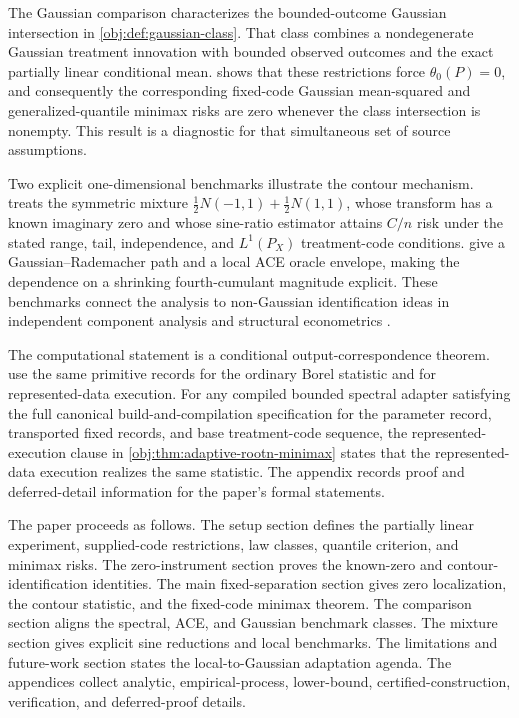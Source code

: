 The Gaussian comparison characterizes the bounded-outcome Gaussian intersection in \cref{obj:def:gaussian-class}. That class combines a nondegenerate Gaussian treatment innovation with bounded observed outcomes and the exact partially linear conditional mean.  shows that these restrictions force \(\theta_0(P)=0\), and consequently the corresponding fixed-code Gaussian mean-squared and generalized-quantile minimax risks are zero whenever the class intersection is nonempty. This result is a diagnostic for that simultaneous set of source assumptions.

Two explicit one-dimensional benchmarks illustrate the contour mechanism.  treats the symmetric mixture \(\frac12N(-1,1)+\frac12N(1,1)\), whose transform has a known imaginary zero and whose sine-ratio estimator attains \(C/n\) risk under the stated range, tail, independence, and \(L^1(P_X)\) treatment-code conditions.  give a Gaussian--Rademacher path and a local ACE oracle envelope, making the dependence on a shrinking fourth-cumulant magnitude explicit. These benchmarks connect the analysis to non-Gaussian identification ideas in independent component analysis and structural econometrics \citep{Comon1994,HyvarinenOja1997,HyvarinenKarhunenOja2001,LanneMeitzSaikkonen2017,LeeMesters2024,HoeschLeeMesters2024,ReizingerEtAl2025}.

The computational statement is a conditional output-correspondence theorem.  use the same primitive records for the ordinary Borel statistic and for represented-data execution. For any compiled bounded spectral adapter satisfying the full canonical build-and-compilation specification for the parameter record, transported fixed records, and base treatment-code sequence, the represented-execution clause in \cref{obj:thm:adaptive-rootn-minimax} states that the represented-data execution realizes the same statistic. The appendix records proof and deferred-detail information for the paper's formal statements.

The paper proceeds as follows. The setup section defines the partially linear experiment, supplied-code restrictions, law classes, quantile criterion, and minimax risks. The zero-instrument section proves the known-zero and contour-identification identities. The main fixed-separation section gives zero localization, the contour statistic, and the fixed-code minimax theorem. The comparison section aligns the spectral, ACE, and Gaussian benchmark classes. The mixture section gives explicit sine reductions and local benchmarks. The limitations and future-work section states the local-to-Gaussian adaptation agenda. The appendices collect analytic, empirical-process, lower-bound, certified-construction, verification, and deferred-proof details.
